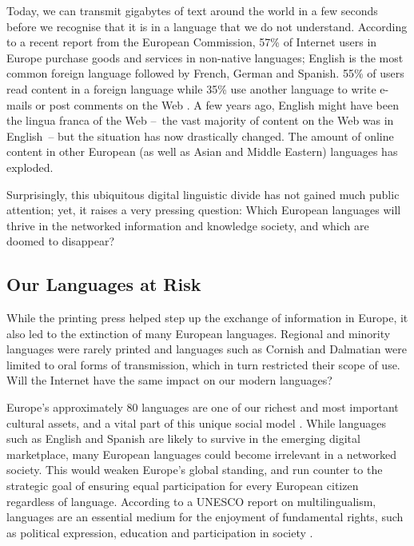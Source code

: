 \begin{multicols}{2}
Today, we can transmit gigabytes of text around the world in a few seconds before we recognise that it is in a language that we do not understand. According to a recent report from the European Commission, 57\% of Internet users in Europe purchase goods and services in non-native languages; English is the most common foreign language followed by French, German and Spanish. 55\% of users read content in a foreign language while 35\% use another language to write e-mails or post comments on the Web \cite{EC1}. A few years ago, English might have been the lingua franca of the Web --~the vast majority of content on the Web was in English~-- but the situation has now drastically changed. The amount of online content in other European (as well as Asian and Middle Eastern) languages has exploded.

Surprisingly, this ubiquitous digital linguistic divide has not gained much public attention; yet, it raises a very pressing question: Which European languages will thrive in the networked information and knowledge society, and which are doomed to disappear?

\subsection{Our Languages at Risk}

While the printing press helped step up the exchange of information in Europe, it also led to the extinction of many European languages. Regional and minority languages were rarely printed and languages such as Cornish and Dalmatian were limited to oral forms of transmission, which in turn restricted their scope of use. Will the Internet have the same impact on our modern languages?


Europe’s approximately 80 languages are one of our richest and most important cultural assets, and a vital part of this unique social model \cite{EC2}. While languages such as English and Spanish are likely to survive in the emerging digital marketplace, many European languages could become irrelevant in a networked society. This would weaken Europe’s global standing, and run counter to the strategic goal of ensuring equal participation for every European citizen regardless of language. According to a UNESCO report on multilingualism, languages are an essential medium for the enjoyment of fundamental rights, such as political expression, education and participation in society \cite{Unesco1}.


\end{multicols}
